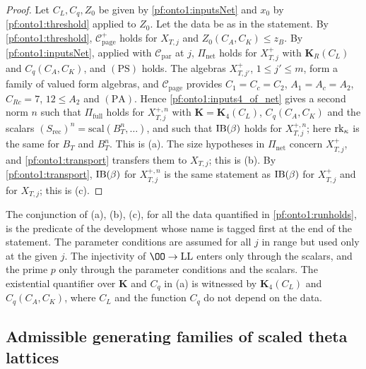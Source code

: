 \begin{proof}
Let $C_L,C_q,Z_0$ be given by \cref{pf:onto1:inputsNet} and $x_0$ by \cref{pf:onto1:threshold} applied to $Z_0$. Let the
data be as in the statement. By \cref{pf:onto1:threshold}, $\mathcal C^+_{\mathrm{page}}$ holds for $X_{T,j}$ and
$Z_0(C_A,C_K)\le z_B$. By \cref{pf:onto1:inputsNet}, applied with $\mathcal C_{\mathrm{par}}$ at $j$, $\Pi_{\mathrm{net}}$ holds for
$X^+_{T,j}$ with $\mathbf K_R(C_L)$ and $C_q(C_A,C_K)$, and $(\mathrm{PS})$ holds. The algebras $X^+_{T,j'}$, $1\le j'\le m$,
form a family of valued form algebras, and $\mathcal C_{\mathrm{page}}$ provides $C_1=C_c=C_2$, $A_1=A_c=A_2$, $C_{Rc}=7$,
$12\le A_2$ and $(\mathrm{PA})$. Hence \cref{pf:onto1:inputs4_of_net} gives a second norm $n$ such that $\Pi_{\mathrm{full}}$
holds for $X^{+,n}_{T,j}$ with $\mathbf K=\mathbf K_4(C_L)$, $C_q(C_A,C_K)$ and the scalars $(S_{\mathrm{rec}})^n=\mathrm{scal}
(B_T^n,\dots)$, and such that $\mathrm{IB}(\beta)$ holds for $X^{+,n}_{T,j}$; here $\operatorname{rk}_\kappa$ is the same for $B_T$ and
$B_T^n$. This is (a). The size hypotheses in $\Pi_{\mathrm{net}}$ concern $X^+_{T,j}$, and \cref{pf:onto1:transport} transfers
them to $X_{T,j}$; this is (b). By \cref{pf:onto1:transport}, $\mathrm{IB}(\beta)$ for $X^{+,n}_{T,j}$ is the same statement as
$\mathrm{IB}(\beta)$ for $X^+_{T,j}$ and for $X_{T,j}$; this is (c).
\end{proof}

\begin{remark}\label{pf:onto1:rem-runholds}
The conjunction of (a), (b), (c), for all the data quantified in \cref{pf:onto1:runholds}, is the predicate of the
development whose name is tagged first at the end of the statement. The parameter conditions
are assumed for all $j$ in range but used only at the given $j$. The injectivity of $\OO\to\mathrm{LL}$ enters only
through the scalars, and the prime $p$ only through the parameter conditions and the scalars. The existential
quantifier over $\mathbf K$ and $C_q$ in (a) is witnessed by $\mathbf K_4(C_L)$ and $C_q(C_A,C_K)$, where $C_L$ and the
function $C_q$ do not depend on the data.
\end{remark}

\subsection{Admissible generating families of scaled theta lattices}\label{sec:pf:onto1:gen}

